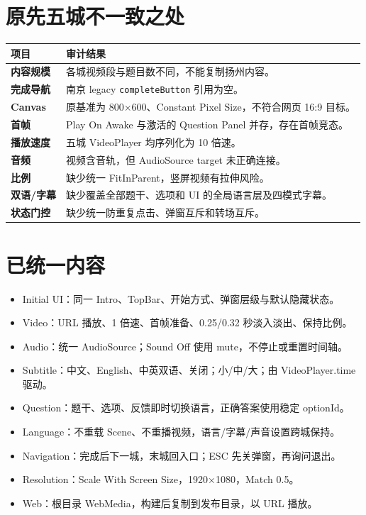 \documentclass[UTF8,a4paper,11pt]{ctexart}
\newcommand{\code}[1]{\texttt{#1}}
\begin{document}
\section{原先五城不一致之处}
\begin{longtable}{>{\bfseries}p{3.0cm}p{11.5cm}}
\toprule
项目 & 审计结果\\
\midrule
\endhead
内容规模 & 各城视频段与题目数不同，不能复制扬州内容。\\
完成导航 & 南京 legacy \code{completeButton} 引用为空。\\
Canvas & 原基准为 800×600、Constant Pixel Size，不符合网页 16:9 目标。\\
首帧 & Play On Awake 与激活的 Question Panel 并存，存在首帧竞态。\\
播放速度 & 五城 VideoPlayer 均序列化为 10 倍速。\\
音频 & 视频含音轨，但 AudioSource target 未正确连接。\\
比例 & 缺少统一 FitInParent，竖屏视频有拉伸风险。\\
双语/字幕 & 缺少覆盖全部题干、选项和 UI 的全局语言层及四模式字幕。\\
状态门控 & 缺少统一防重复点击、弹窗互斥和转场互斥。\\
\bottomrule
\end{longtable}

\section{已统一内容}
\begin{itemize}
\item Initial UI：同一 Intro、TopBar、开始方式、弹窗层级与默认隐藏状态。
\item Video：URL 播放、1 倍速、首帧准备、0.25/0.32 秒淡入淡出、保持比例。
\item Audio：统一 AudioSource；Sound Off 使用 mute，不停止或重置时间轴。
\item Subtitle：中文、English、中英双语、关闭；小/中/大；由 VideoPlayer.time 驱动。
\item Question：题干、选项、反馈即时切换语言，正确答案使用稳定 optionId。
\item Language：不重载 Scene、不重播视频，语言/字幕/声音设置跨城保持。
\item Navigation：完成后下一城，末城回入口；ESC 先关弹窗，再询问退出。
\item Resolution：Scale With Screen Size，1920×1080，Match 0.5。
\item Web：根目录 WebMedia，构建后复制到发布目录，以 URL 播放。
\end{itemize}
\end{document}
